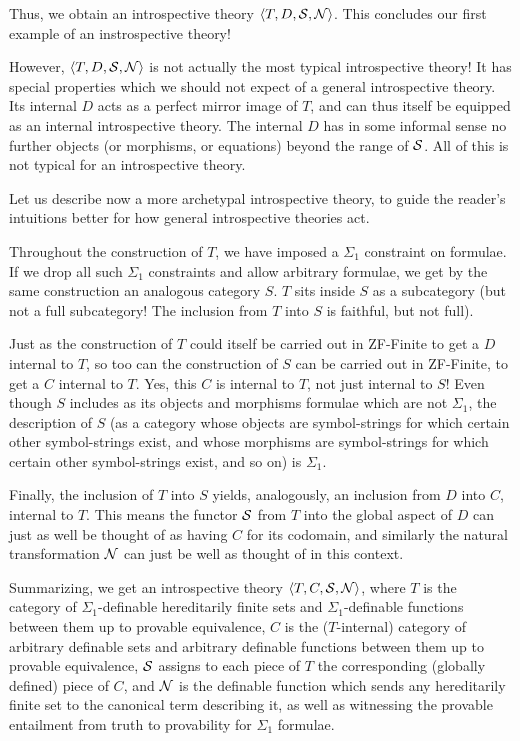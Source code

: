 Thus, we obtain an introspective theory $\langle T, D, \mathcal{S}, \mathcal{N} \rangle$. This concludes our first example of an instrospective theory!

\bigskip
However, $\langle T, D, \mathcal{S}, \mathcal{N} \rangle$ is not actually the most typical introspective theory! It has special properties which we should not expect of a general introspective theory. Its internal $D$ acts as a perfect mirror image of $T$, and can thus itself be equipped as an internal introspective theory. The internal $D$ has in some informal sense no further objects (or morphisms, or equations) beyond the range of $\mathcal{S}$. All of this is not typical for an introspective theory.

\begin{construction}
Let us describe now a more archetypal introspective theory, to guide the reader's intuitions better for how general introspective theories act.
\end{construction}

Throughout the construction of $T$, we have imposed a $\Sigma_1$ constraint on formulae. If we drop all such $\Sigma_1$ constraints and allow arbitrary formulae, we get by the same construction an analogous category $S$. $T$ sits inside $S$ as a subcategory (but not a full subcategory! The inclusion from $T$ into $S$ is faithful, but not full).

Just as the construction of $T$ could itself be carried out in ZF-Finite to get a $D$ internal to $T$, so too can the construction of $S$ can be carried out in ZF-Finite, to get a $C$ internal to $T$. Yes, this $C$ is internal to $T$, not just internal to $S$! Even though $S$ includes as its objects and morphisms formulae which are not $\Sigma_1$, the description of $S$ (as a category whose objects are symbol-strings for which certain other symbol-strings exist, and whose morphisms are symbol-strings for which certain other symbol-strings exist, and so on) is $\Sigma_1$.

Finally, the inclusion of $T$ into $S$ yields, analogously, an inclusion from $D$ into $C$, internal to $T$. This means the functor $\mathcal{S}$ from $T$ into the global aspect of $D$ can just as well be thought of as having $C$ for its codomain, and similarly the natural transformation $\mathcal{N}$ can just be well as thought of in this context.

Summarizing, we get an introspective theory $\langle T, C, \mathcal{S}, \mathcal{N} \rangle$, where $T$ is the category of $\Sigma_1$-definable hereditarily finite sets and $\Sigma_1$-definable functions between them up to provable equivalence, $C$ is the ($T$-internal) category of arbitrary definable sets and arbitrary definable functions between them up to provable equivalence, $\mathcal{S}$ assigns to each piece of $T$ the corresponding (globally defined) piece of $C$, and $\mathcal{N}$ is the definable function which sends any hereditarily finite set to the canonical term describing it, as well as witnessing the provable entailment from truth to provability for $\Sigma_1$ formulae.


